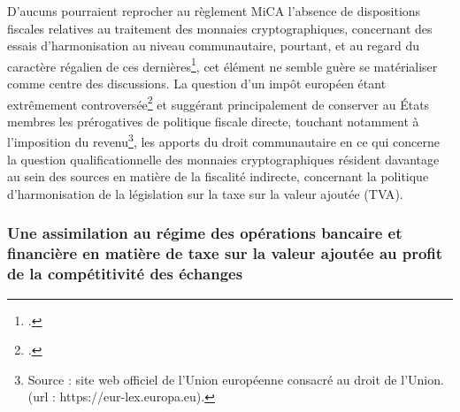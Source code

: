 {D'aucuns pourraient reprocher au règlement MiCA l'absence de dispositions fiscales relatives au traitement des monnaies cryptographiques, concernant des essais d'harmonisation au niveau communautaire, pourtant, et au regard du caractère régalien de ces dernières\footnote{.}, cet élément ne semble guère se matérialiser comme centre des discussions. La question d'un impôt européen étant extrêmement controversée\footnote{.} et suggérant principalement de conserver au États membres les prérogatives de  politique fiscale directe, touchant notamment à l'imposition du revenu\footnote{Source : site web officiel de l'Union européenne consacré au droit de l'Union. (url : https://eur-lex.europa.eu).}, les apports du droit communautaire en ce qui concerne la question qualificationnelle des monnaies cryptographiques résident davantage au sein des sources en matière de la fiscalité indirecte, concernant la politique d'harmonisation de la législation sur la taxe sur la valeur ajoutée (\acrshort{TVA}).

\subsubsection{Une assimilation au régime des opérations bancaire et financière en matière de taxe sur la valeur ajoutée au profit de la compétitivité des échanges}

}
